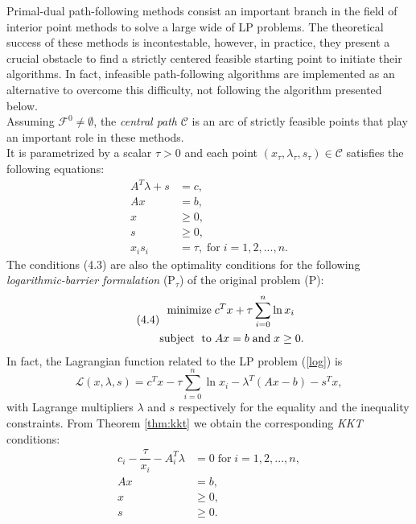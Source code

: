 \documentclass[a4paper,10 pt,titlepage,twoside]{book}
\theoremstyle{plain}
\theoremstyle{definition}
\theoremstyle{remark}
\begin{document}
Primal-dual path-following methods consist an
important branch in the field of interior point methods to solve a large wide of LP problems.
The theoretical success of these methods is incontestable, however, in practice, they present a crucial obstacle
to find a strictly centered feasible starting point to initiate their algorithms. In fact, infeasible path-following algorithms are implemented as an alternative to overcome this difficulty, not following the algorithm presented below.\\ Assuming $\mathcal{F}^{0}\neq \emptyset $, the \textit{central path} $\mathcal{C}$ is an arc of strictly feasible points that play an important role in these methods. \\It is parametrized by a scalar $\tau  > 0$ and each point $(x_{\tau}, \lambda_{\tau}, s_{\tau})\in \mathcal{C}$ satisfies the following equations:
\begin{align}
A^{T}\lambda+s&=c,\tag{4.3a}\\
Ax&=b,\tag{4.3b}\\\label{KKT2}
x&\geq 0,\tag{4.3c}\\
s&\geq 0,\tag{4.3d}\\
x_{i}s_{i}&= \tau,\; \text{for}\;i= 1,2,...,n.\tag{4.3e}\label{(Tao)}
\end{align} 
The conditions (4.3) are also the optimality conditions for the following \textit{logarithmic-barrier formulation} (P$_{\tau}$) of the original problem (P):
\begin{equation}\label{log}\tag{4.4}
\begin{split}
\text{minimize\;} &c^{T}x + \tau\sum_{i=0}^{n}\ln{x_{i}}\\
\text{subject\; to\;}&Ax = b\;\text{and\;} x\geq0.
\end{split}
\end{equation}
In fact, the Lagrangian function related to the LP problem (\ref{log}) is
\begin{equation*}
\mathcal{L}(x,\lambda,s)=c^{T}x- \tau\sum_{i=0}^{n}\ln{x_{i}}-\lambda^{T}\left(Ax-b\right)-s^{T}x,
\end{equation*}
with Lagrange multipliers $\lambda$ and $s$ respectively for the equality and the inequality constraints. From Theorem \ref{thm:kkt} we obtain the corresponding \textit{KKT} conditions:
\begin{align*}
c_{i} - \dfrac{\tau}{x_{i}} - A^{T}_{i}\lambda&= 0\; \text{for}\;i = 1,2,...,n,\\
Ax&=b,\\
x&\geq 0,\\
s&\geq 0.\\
\end{align*}  
\end{document}
